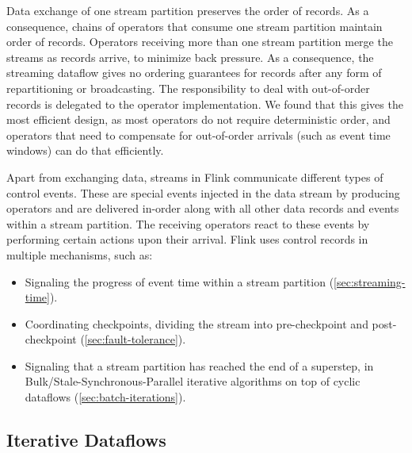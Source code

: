 \noindent {}

 Data exchange of one stream partition preserves the order of records. As a consequence, chains of operators that consume one stream partition maintain order of records. Operators receiving more than one stream partition merge the streams as records arrive, to minimize back pressure. As a consequence, the streaming dataflow gives no ordering guarantees for records after any form of repartitioning or broadcasting. The responsibility to deal with out-of-order records is delegated to the operator implementation. We found that this gives the most efficient design, as most operators do not require deterministic order, and operators that need to compensate for out-of-order arrivals (such as event time windows) can do that efficiently.

 Apart from exchanging data, streams in Flink communicate different types of control events. These are special events injected in the data stream by producing operators and are delivered in-order along with all other data records and events within a stream partition. The receiving operators react to these events by performing certain actions upon their arrival. Flink uses control records in multiple mechanisms, such as: \vspace{-2mm}
\begin{itemize}
\item Signaling the progress of event time within a stream partition (\autoref{sec:streaming-time}). \vspace{-3mm}
\item Coordinating checkpoints, dividing the stream into pre-checkpoint and post-checkpoint (\autoref{sec:fault-tolerance}). \vspace{-3mm}
\item Signaling that a stream partition has reached the end of a superstep, in Bulk/Stale-Synchronous-Parallel iterative algorithms on top of cyclic dataflows (\autoref{sec:batch-iterations}). \vspace{-3mm}
\end{itemize}

\subsection{Iterative Dataflows}

